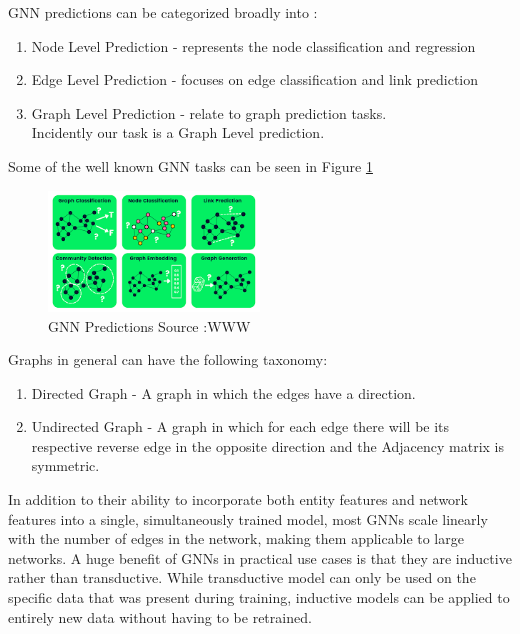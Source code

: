 \documentclass{report} %
\begin{document}
\ac{GNN} predictions can be categorized broadly into : \cite{GNN-2019}
\begin{enumerate}
    \item Node Level Prediction - represents the node classification and regression
    \item Edge Level Prediction - focuses on edge classification and link prediction
    \item Graph Level Prediction - relate to graph prediction tasks.\\
    Incidently our task is a Graph Level prediction.
\end{enumerate}

Some of the well known \ac{GNN} tasks can be seen in Figure \ref{fig:GNN Predictions}
\begin{figure}[H]
    \centering
    \includegraphics[width=0.5\textwidth]{./ReportImages/GraphTasks.png} 
    \caption{\ac{GNN} Predictions Source :WWW} 
    \label{fig:GNN Predictions}
\end{figure}
Graphs in general can have the following taxonomy: \cite{GNN-2019}

\begin{enumerate}
    \item Directed Graph - A graph in which the edges have a direction.
    \item Undirected Graph - A graph in which for each edge there will be its respective reverse edge in the opposite direction and the Adjacency matrix is symmetric.
\end{enumerate}

In addition to their ability to incorporate both entity features and network features into a single, simultaneously trained model, most GNNs scale linearly with the number of edges in the network, making them applicable to large
networks. A huge benefit of GNNs in practical use cases is that they are inductive rather than transductive. While transductive model can only be used on the specific data that was present during training, 
inductive models can be applied to entirely new data without having to be retrained. \cite{ML HGNN-2023}
\end{document}
